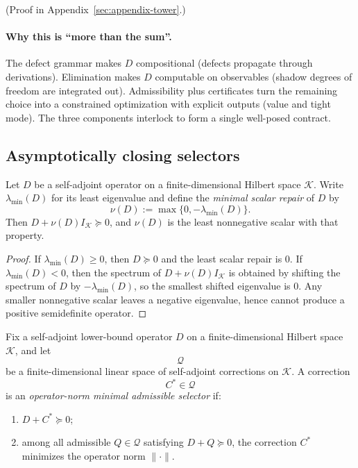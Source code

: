 (Proof in Appendix~\ref{sec:appendix-tower}.)

\paragraph{Why this is ``more than the sum''.}
\label{rem:more-than-sum}
The defect grammar makes $D$ compositional (defects propagate through derivations).
Elimination makes $D$ computable on observables (shadow degrees of freedom are integrated out).
Admissibility plus certificates turn the remaining choice into a constrained optimization with explicit outputs (value and tight mode).
The three components interlock to form a single well-posed contract.

\subsection{Asymptotically closing selectors}
\label{subsec:asymptotically-closing-selectors}

\begin{definition}
\label{def:minimal-scalar-repair}
Let $D$ be a self-adjoint operator on a finite-dimensional Hilbert space
$\mathcal K$. Write $\lambda_{\min}(D)$ for its least eigenvalue and define the
\emph{minimal scalar repair} of $D$ by
\[
\nu(D):=\max\{0,-\lambda_{\min}(D)\}.
\]
Then $D+\nu(D)I_{\mathcal K}\succeq 0$, and $\nu(D)$ is the least nonnegative
scalar with that property.
\end{definition}

\begin{proof}
If $\lambda_{\min}(D)\ge 0$, then $D\succeq 0$ and the least scalar repair is
$0$. If $\lambda_{\min}(D)<0$, then the spectrum of
$D+\nu(D)I_{\mathcal K}$ is obtained by shifting the spectrum of $D$ by
$-\lambda_{\min}(D)$, so the smallest shifted eigenvalue is $0$. Any smaller
nonnegative scalar leaves a negative eigenvalue, hence cannot produce a
positive semidefinite operator.
\end{proof}

\begin{definition}
\label{def:operator-norm-minimal-selector}
Fix a self-adjoint lower-bound operator $D$ on a finite-dimensional Hilbert
space $\mathcal K$, and let
\[
\mathcal Q
\]
be a finite-dimensional linear space of self-adjoint corrections on
$\mathcal K$. A correction
\[
C^\ast\in\mathcal Q
\]
is an \emph{operator-norm minimal admissible selector} if:
\begin{enumerate}[label=(\roman*), leftmargin=2em, itemsep=0.2em]
\item $D+C^\ast\succeq 0$;
\item among all admissible $Q\in\mathcal Q$ satisfying
      $D+Q\succeq 0$, the correction $C^\ast$ minimizes the operator norm
      $\|\cdot\|$.
\end{enumerate}
\end{definition}

